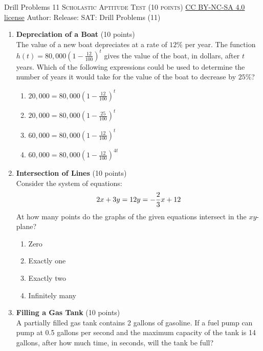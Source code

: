 \newpage\handout
{Drill Problems 11}
{\textsc{Scholastic Aptitude Test (10 points)}}
{\href{https://creativecommons.org/licenses/by-nc-sa/4.0/}{CC BY-NC-SA 4.0 license}}
{Author: \BookAuthor}{Release: \generatedOn}
{SAT: Drill Problems (11)}



\begin{enumerate}
  \item \textbf{Depreciation of a Boat} (10 points)\\
  The value of a new boat depreciates at a rate of $12\%$ per year. The function $h(t) = 80,000\left(1-\frac{12}{100}\right)^t$ gives the value of the boat, in dollars, after $t$ years. Which of the following expressions could be used to determine the number of years it would take for the value of the boat to decrease by $25\%$?
  \begin{enumerate}[label=(\Alph*)]
    \item $20,000 = 80,000\left(1-\frac{12}{100}\right)^t$
    \item $20,000 = 80,000\left(1-\frac{25}{100}\right)^t$
    \item $60,000 = 80,000\left(1-\frac{12}{100}\right)^t$
    \item $60,000 = 80,000\left(1-\frac{12}{100}\right)^{4t}$
  \end{enumerate}
  \begin{subanswer}
  \end{subanswer}

  \item \textbf{Intersection of Lines} (10 points)\\
  Consider the system of equations:
  \[
    2x + 3y = 12 \\
    y = -\frac{2}{3}x + 12
  \]
  At how many points do the graphs of the given equations intersect in the $xy$-plane?
  \begin{enumerate}[label=(\Alph*)]
    \item Zero
    \item Exactly one
    \item Exactly two
    \item Infinitely many
  \end{enumerate}
  \begin{subanswer}
  \end{subanswer}

  \item \textbf{Filling a Gas Tank} (10 points)\\
  A partially filled gas tank contains 2 gallons of gasoline. If a fuel pump can pump at 0.5 gallons per second and the maximum capacity of the tank is 14 gallons, after how much time, in seconds, will the tank be full?
  \begin{subanswer}
  \end{subanswer}


\end{enumerate}
